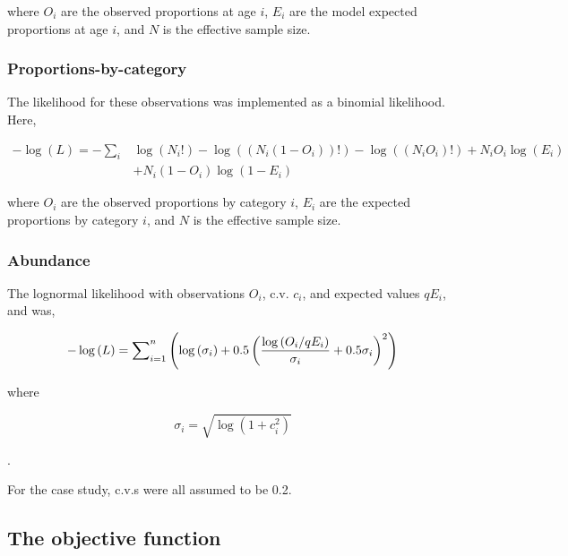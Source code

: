 where $O_i$ are the observed proportions at age $i$, $E_i$ are the model expected proportions at age $i$, and $N$ is the effective sample size. 

\subsubsection{Proportions-by-category}

The likelihood for these observations was implemented as a binomial likelihood. Here, 

\begin{equation}
  \begin{split}
    -\log \left(L \right)= -\sum\limits_i & \log \left(N_i! \right) - \log \left(\left(N_i \left(1 - O_i \right) \right)! \right) - \log \left(\left(N_i O_i \right)! \right) + N_i O_i \log \left(E_i \right) \\
    &+ N_i \left(1 - O_i \right)\log \left(1 - E_i \right)
  \end{split}
\end{equation}

where $O_i$ are the observed proportions by category $i$, $E_i$ are the expected proportions by category $i$, and $N$ is the effective sample size. 

\subsubsection{Abundance}

The lognormal likelihood with observations $O_i$, c.v. $c_i$, and expected values $qE_i$, and was,

\begin{equation}
 - \log \left( L \right) = \sum\nolimits_{i = 1}^n \left( {\log \left( {\sigma _i } \right) + 0.5\left( {\frac{{\log \left( {{{O_i } \mathord{\left/  {\vphantom {{O_i } {qE_i }}} \right. \kern-\nulldelimiterspace} {qE_i }}} \right)}} {{\sigma _i }} + 0.5\sigma _i } \right)^2 } \right) 
\end{equation}

where 

\begin{equation}
  \sigma_i  = \sqrt{\log \left(1+c_i^2 \right)}
\end{equation}

.

For the case study, c.v.s were all assumed to be 0.2.


\subsection{The objective function}

